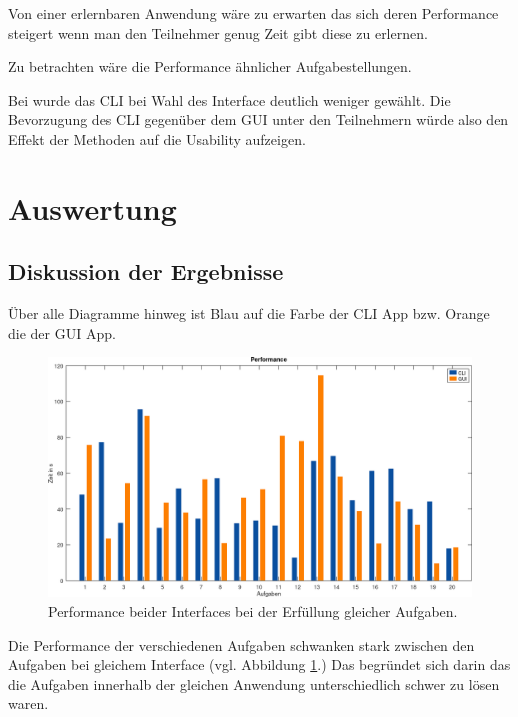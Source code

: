 \documentclass[oneside,bibliography=totocnumbered,BCOR=5mm]{scrbook}
\begin{document}
Von einer erlernbaren Anwendung wäre zu erwarten das sich deren Performance
steigert wenn man den Teilnehmer genug Zeit gibt diese zu erlernen.

Zu betrachten wäre die Performance ähnlicher Aufgabestellungen.


Bei \textcite{Westerman_1997} wurde das CLI bei Wahl des Interface deutlich weniger
gewählt. Die Bevorzugung des CLI gegenüber dem GUI unter den Teilnehmern würde
also den Effekt der Methoden auf die Usability aufzeigen.

\section{Auswertung}
\label{sec:auswertung}

\subsection{Diskussion der Ergebnisse}

Über alle Diagramme hinweg ist Blau auf die Farbe der CLI App bzw. Orange die
der GUI App.

\begin{figure}[H]
  \centering
  \includegraphics[scale=0.36]{performance.png}
  \caption{Performance beider Interfaces bei der Erfüllung gleicher Aufgaben.}
  \label{fig:performance}
\end{figure}

Die Performance der verschiedenen Aufgaben schwanken stark zwischen den Aufgaben
bei gleichem Interface (vgl. Abbildung \ref{fig:performance}.) Das begründet
sich darin das die Aufgaben innerhalb der gleichen Anwendung unterschiedlich
schwer zu lösen waren.
\end{document}
